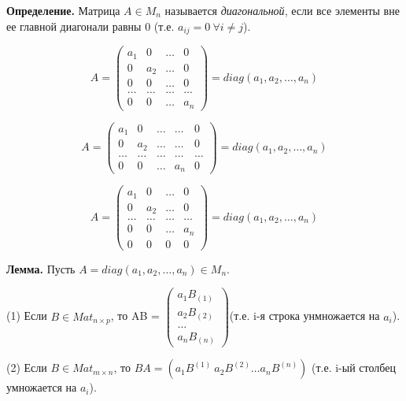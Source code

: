 \vspace{\baselineskip}
\textbf{Определение.} Матрица $A \in M_n$ называется \textit{диагональной}, если все элементы вне ее главной диагонали равны 0 (т.е. $a_{ij} = 0 \ \forall i \neq j$). 

\[A =  \begin{pmatrix} a_1 & 0 & \dots & 0 \\ 0 & a_2 & \dots & 0  \\ 0 & 0 & \dots & 0 \\ \dots & \dots & \dots & \dots \\ 0 & 0 & \dots & a_n \end{pmatrix} = diag(a_1, a_2, \dots , a_n) \]

\begin{comment}
	В дальнейшем понятие \glqq диагональной матрицы\grqq \  будет использоваться также и для неквадратных матриц, условие то же: $a_{ij} = 0 \ \forall  i \neq j$
\end{comment}

\[A =  \begin{pmatrix} a_1 & 0 & \dots & \dots & 0 \\ 0 & a_2 & \dots & \dots & 0  \\ \dots & \dots & \dots & \dots & \dots \\ 0 & 0 & \dots & a_n & 0 \end{pmatrix} = diag(a_1, a_2, \dots , a_n) \]

\[A =  \begin{pmatrix} a_1 & 0 & \dots & 0 \\ 0 & a_2 & \dots & 0  \\ \dots & \dots & \dots & \dots \\ 0 & 0 & \dots & a_n \\ 0 & 0 & 0 & 0 \end{pmatrix} = diag(a_1, a_2, \dots , a_n) \]

\vspace{\baselineskip}
\textbf{Лемма.} Пусть $A = diag(a_1, a_2, \dots, a_n) \in M_n$.

\vspace{\baselineskip}
(1) Если $B \in Mat_{n \times p}$, то AB = $\begin{pmatrix} a_1 B_{(1)} \\ a_2 B_{(2)} \\ \dots \\ a_n B_{(n)} \end{pmatrix} $(т.е. i-я строка унмножается на $a_i$).

\vspace{\baselineskip}
(2) Если $B \in Mat_{m \times n}$, то $BA = (a_1 B^{(1)} \ a_2 B^{(2)} \dots a_n B^{(n)})$ (т.е. i-ый столбец умножается на $a_i$).


